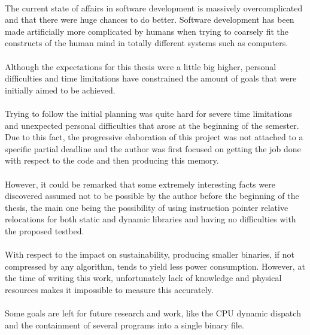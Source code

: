 \documentclass[12pt]{article}
\begin{document}
	\paragraph{}The current state of affairs in software development is massively overcomplicated and that there were huge chances to do better. Software development has been made artificially more complicated by humans when trying to coarsely fit the constructs of the human mind in totally different systems such as computers.
	\paragraph{}Although the expectations for this thesis were a little big higher, personal difficulties and time limitations have constrained the amount of goals that were initially aimed to be achieved.
	\paragraph{}Trying to follow the initial planning was quite hard for severe time limitations and unexpected personal difficulties that arose at the beginning of the semester. Due to this fact, the progressive elaboration of this project was not attached to a specific partial deadline and the author was first focused on getting the job done with respect to the code and then producing this memory.
	\paragraph{}However, it could be remarked that some extremely interesting facts were discovered assumed not to be possible  by the author before the beginning of the thesis, the main one being the possibility of using instruction pointer relative relocations for both static and dynamic libraries and having no difficulties with the proposed testbed.
	\paragraph{}With respect to the impact on sustainability, producing smaller binaries, if not compressed by any algorithm, tends to yield less power consumption. However, at the time of writing this work, unfortunately lack of knowledge and physical resources makes it impossible to measure this accurately.
	\paragraph{}Some goals are left for future research and work, like the CPU dynamic dispatch and the containment of several programs into a single binary file.
	\newpage
	
\end{document}

